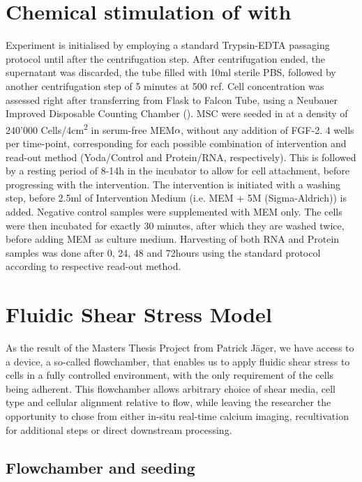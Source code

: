 \section{Chemical stimulation of \Piezo{} with \Yoda}
Experiment is initialised by employing a standard Trypsin-EDTA passaging protocol until after the centrifugation step. After centrifugation ended, the supernatant was discarded, the tube filled with 10ml sterile PBS, followed by another centrifugation step of 5 minutes at 500 rcf. Cell concentration was assessed right after transferring from Flask to Falcon Tube, using a Neubauer Improved Disposable Counting Chamber (). 
MSC were seeded in  at a density of 240'000 Cells/4cm\textsuperscript{2} in serum-free MEM$\alpha$, without any addition of FGF-2. 4 wells per time-point, corresponding for each possible combination of  intervention and read-out method (Yoda/Control and Protein/RNA, respectively). This is followed by a resting period of 8-14h in the incubator to allow for cell attachment, before progressing with the intervention.
The intervention is initiated with a washing step, before 2.5ml of Intervention Medium (i.e. MEM\textalpha{} + 5\textmu{}M \Yoda (Sigma-Aldrich)) is added. Negative control samples were supplemented with MEM\textalpha{} only. The cells were then incubated for exactly 30 minutes, after which they are washed twice, before adding MEM\textalpha{} as culture medium. Harvesting of both RNA and Protein samples was done after 0, 24, 48 and 72hours using the standard protocol according to respective read-out method.\\ 

\section{Fluidic Shear Stress Model}
As the result of the Masters Thesis Project from Patrick Jäger, we have access to a device, a so-called flowchamber, that enables us to apply fluidic shear stress to cells in a fully controlled environment, with the only requirement of the cells being adherent. This flowchamber allows arbitrary choice of shear media, cell type and cellular alignment relative to flow, while leaving the researcher the opportunity to chose from either in-situ real-time calcium imaging, recultivation for additional steps or direct downstream processing.

\subsection{Flowchamber and seeding}

